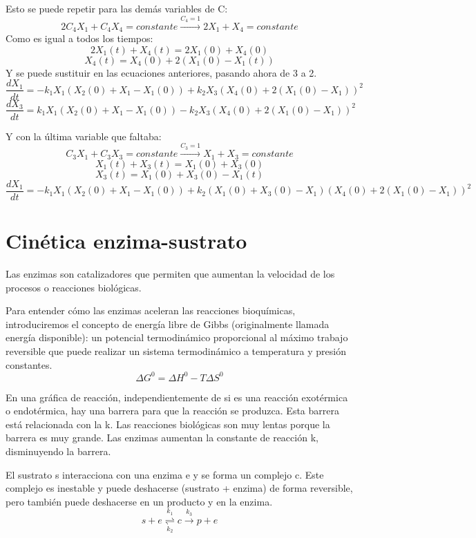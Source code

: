 Esto se puede repetir para las demás variables de C:
$$2C_4X_1 + C_4X_4 = constante \xrightarrow{C_4 = 1} 2X_1 + X_4 = constante$$
Como es igual a todos los tiempos:
$$2X_1(t) + X_4(t) = 2X_1(0) + X_4(0)$$
$$X_4(t) = X_4(0) + 2(X_1(0) - X_1(t))$$
Y se puede sustituir en las ecuaciones anteriores, pasando ahora de 3 a 2.
$$\frac{dX_1}{dt} = -k_1 X_1 (X_2(0) + X_1 - X_1(0)) + k_2 X_3 (X_4(0) + 2(X_1(0) - X_1))^2$$
$$\frac{dX_3}{dt} = k_1 X_1 (X_2(0) + X_1 - X_1(0)) - k_2 X_3 (X_4(0) + 2(X_1(0) - X_1))^2$$

Y con la última variable que faltaba:
$$C_3X_1 + C_3X_3 = constante \xrightarrow{C_3 = 1} X_1 + X_3 = constante$$
$$X_1(t) + X_3(t) = X_1(0) + X_3(0)$$
$$X_3(t) = X_1(0) + X_3(0) - X_1(t)$$
$$\frac{dX_1}{dt} = -k_1 X_1 (X_2(0) + X_1 - X_1(0)) + k_2 (X_1(0) + X_3(0) - X_1) (X_4(0) + 2(X_1(0) - X_1))^2$$

\newpage

\section{Cinética enzima-sustrato}
Las enzimas son catalizadores que permiten que aumentan la velocidad de los procesos o reacciones biológicas. 

Para entender cómo las enzimas aceleran las reacciones bioquímicas, introduciremos el concepto de energía libre de Gibbs (originalmente llamada energía disponible): un potencial termodinámico proporcional al máximo trabajo reversible que puede realizar un sistema termodinámico a temperatura y presión constantes.
$$\Delta G^0 = \Delta H^0 - T \Delta S^0$$

En una gráfica de reacción, independientemente de si es una reacción exotérmica o endotérmica, hay una barrera para que la reacción se produzca. Esta barrera está relacionada con la k. Las reacciones biológicas son muy lentas porque la barrera es muy grande. Las enzimas aumentan la constante de reacción k, disminuyendo la barrera. 

El sustrato s interacciona con una enzima e y se forma un complejo c. Este complejo es inestable y puede deshacerse (sustrato + enzima) de forma reversible, pero también puede deshacerse en un producto y en la enzima.
$$s + e \overset{k_1}{\underset{k_2}{\rightleftharpoons}} c \xrightarrow{k_3} p + e$$